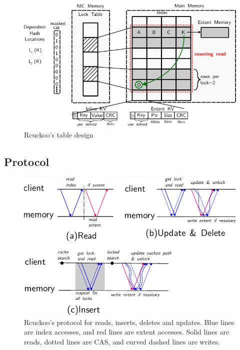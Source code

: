 \begin{figure}[t]
    \includegraphics[width=0.99\linewidth]{fig/table-diagram.pdf}
    \caption{Rcuckoo's table design ~}
    \label{fig:table-diagram}
\end{figure}


\subsection{Protocol}

\begin{figure}[t]
\includegraphics[width=0.99\linewidth]{fig/message_diagram.pdf}

\caption{Rcuckoo's protocol for reads, inserts, deletes and
updates. Blue lines are index accesses, and red lines are
extent accesses. Solid lines are reads, dotted lines are
CAS, and curved dashed lines are writes.}

\label{fig:message_diagram}
\end{figure}

